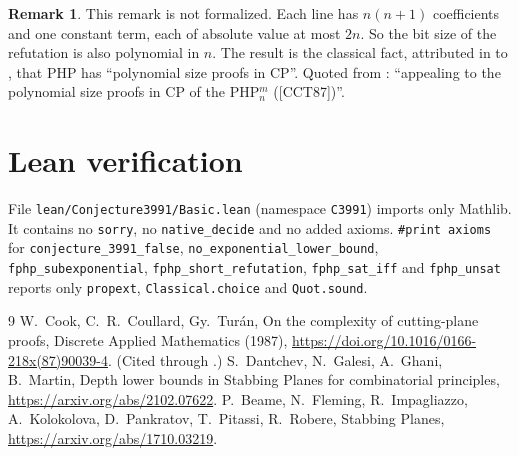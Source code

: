 \documentclass[11pt]{article}
\theoremstyle{definition}
\newtheorem{remark}[theorem]{Remark}
\begin{document}
\begin{remark}\label{rem:bits}
This remark is not formalized. Each line has $n(n+1)$ coefficients and one constant term, each of
absolute value at most $2n$. So the bit size of the refutation is also polynomial in $n$. The result is
the classical fact, attributed in \cite{DGGM} to \cite{CCT}, that PHP has ``polynomial size proofs in CP''.
Quoted from \cite{DGGM}: ``appealing to the polynomial size proofs in CP of the PHP$^{m}_{n}$
([CCT87])''.
\end{remark}

\section{Lean verification}

File \texttt{lean/Conjecture3991/Basic.lean} (namespace \texttt{C3991}) imports only Mathlib. It contains no
\texttt{sorry}, no \texttt{native\_decide} and no added axioms. \texttt{\#print axioms} for
\texttt{conjecture\_3991\_false}, \texttt{no\_exponential\_lower\_bound}, \texttt{fphp\_subexponential},
\texttt{fphp\_short\_refutation}, \texttt{fphp\_sat\_iff} and \texttt{fphp\_unsat} reports only
\texttt{propext}, \texttt{Classical.choice} and \texttt{Quot.sound}.

\begin{thebibliography}{9}
 W.~Cook, C.~R.~Coullard, Gy.~Tur\'an, On the complexity of cutting-plane proofs,
  Discrete Applied Mathematics (1987), \url{https://doi.org/10.1016/0166-218x(87)90039-4}.
  (Cited through \cite{DGGM}.)
 S.~Dantchev, N.~Galesi, A.~Ghani, B.~Martin, Depth lower bounds in Stabbing Planes for
  combinatorial principles, \url{https://arxiv.org/abs/2102.07622}.
 P.~Beame, N.~Fleming, R.~Impagliazzo, A.~Kolokolova, D.~Pankratov, T.~Pitassi,
  R.~Robere, Stabbing Planes, \url{https://arxiv.org/abs/1710.03219}.
\end{thebibliography}
\end{document}
